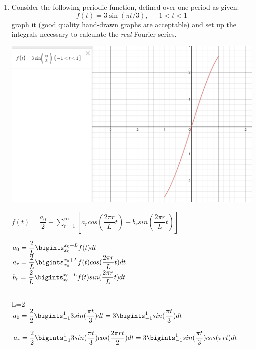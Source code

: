 \documentclass[fleqn]{article}
\begin{document}
\begin{enumerate}

  \item Consider the following periodic function, defined over one period as given: 
  $$
  f\left( t\right) =3\sin \left( \pi t/3\right) ,\;-1<t<1
  $$
  graph it (good quality hand-drawn graphs are acceptable) and set up the integrals necessary to calculate the \emph{real} Fourier series. 
  
    \includegraphics[width=\linewidth]{a.png}
 
    \textcolor{hwColor}{
      $f(t)=\dfrac{a_0}{2}+\sum\limits_{r=1}^{\infty}\left[a_r cos(\dfrac{2\pi r}{L}t)+b_r sin(\dfrac{2\pi r}{L}t)\right]$ 
    } 

    \textcolor{hwColor}{
      $a_0=\dfrac{2}{L}\bigints_{x_0}^{x_0+L}f(t)dt$ \\ 
      $a_r=\dfrac{2}{L}\bigints_{x_0}^{x_0+L}f(t) cos(\dfrac{2\pi r}{L}t)dt$ \\ 
      $b_r=\dfrac{2}{L}\bigints_{x_0}^{x_0+L}f(t) sin(\dfrac{2\pi r}{L}t)dt$ \\ 
    }

    \textcolor{hwColor}{ 
      \rule{15cm}{0.4pt}
    }

    \textcolor{hwColor}{ 
      L=2 \\ 
      $a_0=\dfrac{2}{2}\bigints_{-1}^{1}3sin(\dfrac{\pi t}{3})dt=3 \bigints_{-1}^{1}sin(\dfrac{\pi t}{3})dt$ \\
    }

    \textcolor{hwColor}{
      $a_r=\dfrac{2}{2}\bigints_{-1}^{1}3sin(\dfrac{\pi t}{3}) cos(\dfrac{2\pi rt}{2})dt=3\bigints_{-1}^{1}sin(\dfrac{\pi t}{3}) cos(\pi rt)dt$ \\ 
    } 


\end{enumerate}
\end{document}
